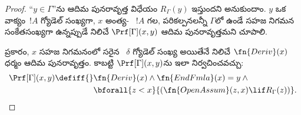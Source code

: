 \documentclass[../../../include/open-logic-section]{subfiles}
\begin{document}
\begin{proof}
  ``$y\in\Gamma$''ను ఆదిమ పునరావృత్త విధేయం $R_\Gamma(y)$ ఇస్తుందని
  అనుకుందాం. $y$ ఒక వాక్యం~$!A$ గ్యోడెల్ సంఖ్యగా, $x$ అంత్య-
  ~$!A$ గల, 
  పరికల్పనలన్నీ $\Gamma$లో ఉండే సహజ నిగమన
   సంకేతసంఖ్యగా ఉన్నప్పుడే నిలిచే
  $\Prf[\Gamma](x,y)$ ఆదిమ పునరావృత్తమని చూపాలి.

   ప్రకారం, $x$ సహజ నిగమనంలో సరైన
  ~$\delta$ గ్యోడెల్ సంఖ్య అయితేనే
  నిలిచే $\fn{Deriv}(x)$ ధర్మం ఆదిమ పునరావృత్తం. కాబట్టి
  $\Prf[\Gamma](x,y)$ను ఇలా నిర్వచించవచ్చు:
  \begin{align*}
    \Prf[\Gamma](x,y)\defiff{}
    &\fn{Deriv}(x)\land\fn{EndFmla}(x)=y\land{}\\
    &\bforall{z<x}{(\fn{OpenAssum}(z,x)\lif R_\Gamma(z))}.
  \end{align*}
\end{proof}
\end{document}
